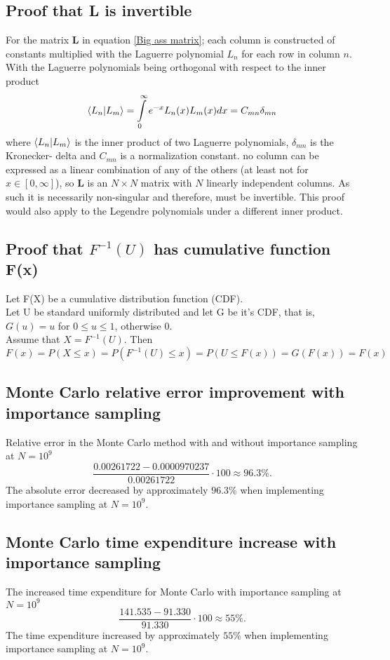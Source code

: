 \documentclass[10pt,a4paper]{article}
\begin{document}
\subsection{Proof that \textbf{L} is invertible}\label{Proof that big ass matrix is invertible}
For the matrix $\textbf{L}$ in equation \ref{Big ass matrix}; each column is constructed of constants multiplied with the Laguerre polynomial $L_n$ for each row in column $n$. With the Laguerre polynomials being orthogonal with respect to the inner product
\begin{equation}
\braket{L_n|L_m} = \int\limits_0^\infty  e^{-x} L_n(x) L_m(x) dx = C_{mn}\delta_{mn}
\end{equation}
where $\braket{L_n|L_m}$ is the inner product of two Laguerre polynomials, $\delta_{mn}$ is the Kronecker- delta and $C_{mn}$ is a normalization constant.
no column can be expressed as a linear combination of any of the others (at least not for $x \in [0,\infty]$), so \textbf{L} is an $N\times N$ matrix with $N$ linearly independent columns. As such it is necessarily non-singular and therefore, must be invertible. This proof would also apply to the Legendre polynomials under a different inner product.
\subsection{Proof that $F^{-1}(U)$ has cumulative function F(x)}\label{Proof of invertible shit, not the matrix stuff}
Let F(X) be a cumulative distribution function (CDF).\\
Let U be standard uniformly distributed and let G be it's CDF, that is, $G(u)=u$ for $0\leq u\leq 1$, otherwise 0.\\
Assume that $X=F^{-1}(U)$. Then
$$F(x)=P(X\leq x)=P(F^{-1}(U)\leq x)=P(U\leq F(x))=G(F(x))=F(x) 
$$ 
\subsection{Monte Carlo relative error improvement with importance sampling}\label{Monte Carlo relative error improvement}
Relative error in the Monte Carlo method with and without importance sampling at $N = 10^9$
$$
\frac{0.00261722-0.0000970237}{0.00261722}\cdot 100 \approx 96.3\%.
$$
The absolute error decreased by approximately $96.3\%$ when implementing importance sampling at $N = 10^9$.
\subsection{Monte Carlo time expenditure increase with importance sampling}\label{Monte Carlo time increase}
The increased time expenditure for Monte Carlo with importance sampling at $N = 10^9$
$$
\frac{141.535-91.330}{91.330}\cdot 100 \approx 55\%.
$$
The time expenditure increased by approximately $55\%$ when implementing importance sampling at $N = 10^9$.
\end{document}

